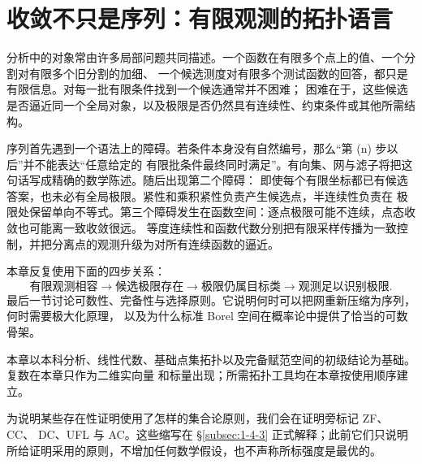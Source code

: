 \chapter{收敛不只是序列：有限观测的拓扑语言}\label{ch:01}

分析中的对象常由许多局部问题共同描述。一个函数在有限多个点上的值、一个分割对有限多个旧分割的加细、
一个候选测度对有限多个测试函数的回答，都只是有限信息。对每一批有限条件找到一个候选通常并不困难；
困难在于，这些候选是否逼近同一个全局对象，以及极限是否仍然具有连续性、约束条件或其他所需结构。

序列首先遇到一个语法上的障碍。若条件本身没有自然编号，那么“第 (n) 步以后”并不能表达“任意给定的
有限批条件最终同时满足”。有向集、网与滤子将把这句话写成精确的数学陈述。随后出现第二个障碍：
即使每个有限坐标都已有候选答案，也未必有全局极限。紧性和乘积紧性负责产生候选点，半连续性负责在
极限处保留单向不等式。第三个障碍发生在函数空间：逐点极限可能不连续，点态收敛也可能离一致收敛很远。
等度连续性和函数代数分别把有限采样传播为一致控制，并把分离点的观测升级为对所有连续函数的逼近。

本章反复使用下面的四步关系：
\begin{equation}\label{eq:ch1-main-chain}
  \text{有限观测相容}
  \longrightarrow \text{候选极限存在}
  \longrightarrow \text{极限仍属目标类}
  \longrightarrow \text{观测足以识别极限}.
\end{equation}
最后一节讨论可数性、完备性与选择原则。它说明何时可以把网重新压缩为序列，何时需要极大化原理，
以及为什么标准 Borel 空间在概率论中提供了恰当的可数骨架。

本章以本科分析、线性代数、基础点集拓扑以及完备赋范空间的初级结论为基础。复数在本章只作为二维实向量
和标量出现；所需拓扑工具均在本章按使用顺序建立。

为说明某些存在性证明使用了怎样的集合论原则，我们会在证明旁标记 \textsf{ZF}、\textsf{CC}、
\textsf{DC}、\textsf{UFL} 与 \textsf{AC}。这些缩写在 \S\ref{subsec:1-4-3} 正式解释；此前它们只说明
所给证明采用的原则，不增加任何数学假设，也不声称所标强度是最优的。





